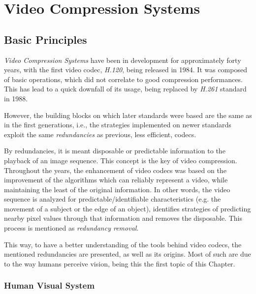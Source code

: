 \cleardoublepage
\chapter{Video Compression Systems}\label{chap:av1}

\section{Basic Principles}

\emph{Video Compression Systems} have been in development for approximately forty years, with the first video codec, \emph{H.120}, being released in 1984. It was composed of basic operations, which did not correlate to good compression performances. This has lead to a quick downfall of its usage, being replaced by \emph{H.261} standard in 1988.

However, the building blocks on which later standards were based are the same as in the first generations, i.e., the strategies implemented on newer standards exploit the same \emph{redundancies} as previous, less efficient, codecs.

By redundancies, it is meant disposable or predictable information to the playback of an image sequence. This concept is the key of video compression. Throughout the years, the enhancement of video codecs was based on the improvement of the algorithms which can reliably represent a video, while maintaining the least of the original information. In other words, the video sequence is analyzed for predictable/identifiable characteristics (e.g. the movement of a subject or the edge of an object), identifies strategies of predicting nearby pixel values through that information and removes the disposable. This process is mentioned as \emph{redundancy removal}.

This way, to have a better understanding of the tools behind video codecs, the mentioned redundancies are presented, as well as its origins. Most of such are due to the way humans perceive vision, being this the first topic of this Chapter.

\subsection{Human Visual System} \label{ssec:hvs}


